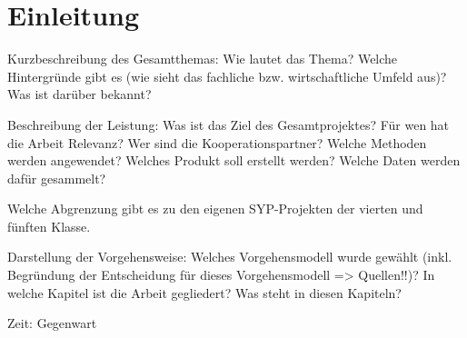 \chapter{Einleitung}

Kurzbeschreibung des Gesamtthemas: Wie lautet das Thema? Welche Hintergründe gibt es (wie sieht das fachliche bzw. wirtschaftliche Umfeld aus)? Was ist darüber bekannt?

Beschreibung der Leistung: Was ist das Ziel des Gesamtprojektes? Für wen hat die Arbeit Relevanz? Wer sind die Kooperationspartner? Welche Methoden werden angewendet? Welches Produkt soll erstellt werden? Welche Daten werden dafür gesammelt?

Welche Abgrenzung gibt es zu den eigenen SYP-Projekten der vierten und fünften Klasse.

Darstellung der Vorgehensweise: Welches Vorgehensmodell wurde gewählt (inkl. Begründung der Entscheidung für dieses Vorgehensmodell => Quellen!!)? In welche Kapitel ist die Arbeit gegliedert? Was steht in diesen Kapiteln?

Zeit: Gegenwart

